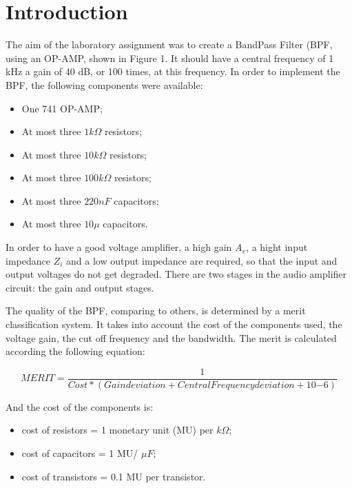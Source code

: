 \section{Introduction}
\label{sec:introduction}

The aim of the laboratory assignment was to create a BandPass Filter (BPF, using an OP-AMP, shown in Figure 1. It should have a central frequency of 1 kHz a gain of 40 dB, or 100 times, at this frequency. In order to implement the BPF, the following components were available:

\begin{itemize}
	\item One 741 OP-AMP;
    \item At most three $1k \Omega$ resistors;
    \item At most three $10k \Omega$ resistors;
    \item At most three $100k \Omega$ resistors;
    \item At most three $220nF$ capacitors;
    \item At most three $10 \mu$ capacitors.
\end{itemize}


In order to have a good voltage amplifier, a high gain $A_v$, a hight input impedance $Z_i$ and a low output impedance are required, so that the input and output voltages do not get degraded. There are two stages in the audio amplifier circuit: the gain and output stages. 

The quality of the BPF, comparing to others, is determined by a merit classification system. It takes into account the cost of the components used, the voltage gain, the cut off frequency and the bandwidth. The merit is calculated according the following equation:

\begin{equation}
	MERIT = \frac {1}{Cost * (Gain deviation + Central Frequency deviation + 10{-6} )}
	\label{eq:i1}
\end{equation}

And the cost of the components is: 

\begin{itemize}
	\item cost of resistors = 1 monetary unit (MU) per $k \Omega$;
    \item cost of capacitors = 1 MU/ $\mu F$;
    \item cost of transistors = 0.1 MU per transistor.
\end{itemize}

